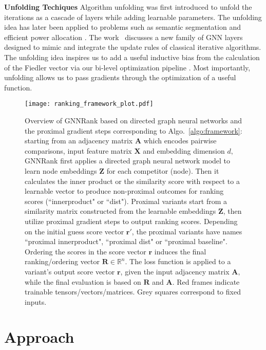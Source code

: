 \documentclass[nohyperref]{article}
\theoremstyle{plain}
\theoremstyle{definition}
\theoremstyle{remark}
\begin{document}
\textbf{Unfolding Techiques}
Algorithm unfolding \cite{gregor2010learning} was first introduced to unfold the iterations as a cascade of layers while adding learnable parameters. The unfolding idea has later been applied to problems such as semantic segmentation \cite{liu2017deep} and efficient power allocation \cite{chowdhury2021unfolding}. The work~\cite{yang2021graph} discusses a new family of GNN layers designed to mimic and integrate the update rules of classical iterative algorithms. The unfolding idea inspires us to add a useful inductive bias from the calculation of the Fiedler vector via our bi-level optimization pipeline \cite{talbi2013taxonomy}. Most importantly, unfolding allows us to pass gradients through the optimization of a useful function.
\begin{figure*}[tb!]
\centering
\texttt{[image: ranking\_framework\_plot.pdf]}
\vspace{-10pt}
\caption{Overview of GNNRank based on directed graph neural networks and the proximal gradient steps corresponding to Algo.~\ref{algo:framework}: starting from an adjacency matrix $\mathbf{A}$ which encodes pairwise comparisons, input feature matrix $\mathbf{X}$ and embedding dimension $d,$ GNNRank first applies a directed graph neural network model to learn node embeddings $\mathbf{Z}$ for each competitor (node). Then it calculates the inner product or the similarity score with respect to a learnable vector to produce non-proximal outcomes for ranking scores (``innerproduct" or ``dist"). Proximal  variants start from a similarity matrix constructed from the learnable embeddings $\mathbf{Z}$, then utilize proximal gradient steps to output ranking scores. Depending on the initial guess score vector $\mathbf{r}'$, the proximal variants have names ``proximal innerproduct", ``proximal dist" or ``proximal baseline". Ordering the scores in the score vector $\mathbf{r}$ induces the final ranking/ordering vector $\mathbf{R}\in\mathbb{R}^n.$ The loss function is applied to a variant's output score vector $\mathbf{r}$, given the  input adjacency matrix $\mathbf{A},$ while the final evaluation is based on $\mathbf{R}$ and $\mathbf{A}.$ Red frames indicate trainable tensors/vectors/matrices. Grey squares correspond to fixed inputs.}
    \label{fig:framework_overview}
\end{figure*}
\section{Approach}
\end{document}

